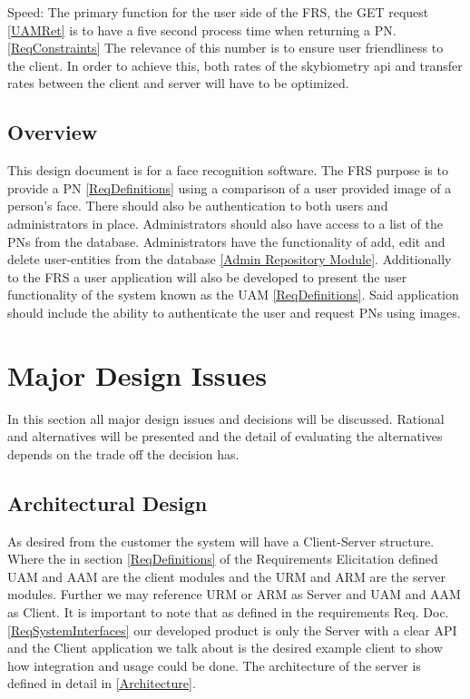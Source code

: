 \documentclass[a4paper,11pt]{article}
\begin{document}
Speed: The primary function for the user side of the FRS, the GET request \ref{UAMRet} is to have a five second process time when returning a PN. \ref{ReqConstraints} The relevance of this number is to ensure user friendliness to the client.
In order to achieve this, both rates of the skybiometry api and transfer rates between the client and server will have to be optimized.

\subsection{Overview}
This design document is for a face recognition software. The FRS purpose is to provide a PN \ref{ReqDefinitions} using a comparison of a user provided image of a person's face. There should also be authentication to both users and administrators in place. Administrators should also have access to a list of the PNs from the database. Administrators have the functionality of add, edit and delete user-entities from the database \ref{Admin Repository Module}.
Additionally to the FRS a user application will also be developed to present the user functionality of the system known as the UAM \ref{ReqDefinitions}. Said application should include the ability to authenticate the user and request PNs using images.

\section{Major Design Issues} \label{Major_Design_Issues}
In this section all major design issues and decisions will be discussed. Rational and alternatives will be presented and the detail of evaluating the alternatives depends on the trade off the decision has.

\subsection{Architectural Design} 
As desired from the customer the system will have a Client-Server structure. Where the in section \ref{ReqDefinitions} of the Requirements Elicitation defined UAM and AAM are the client modules and the URM and ARM are the server modules. Further we may reference URM or ARM as Server and UAM and AAM as Client. It is important to note that as defined in the requirements Req. Doc. \ref{ReqSystemInterfaces} our developed product is only the Server with a clear API and the Client application we talk about is the desired example client to show how integration and usage could be done.
The architecture of the server is defined in detail in \ref{Architecture}.
\end{document}
